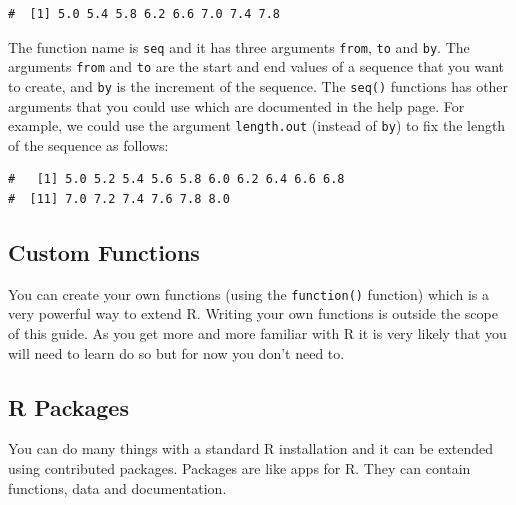 \documentclass[a4paper,9pt,twocolumn,twoside,printwatermark=false]{pinp}
\begin{document}
\begin{ShadedResult}
\begin{verbatim}
#  [1] 5.0 5.4 5.8 6.2 6.6 7.0 7.4 7.8
\end{verbatim}
\end{ShadedResult}

The function name is \texttt{seq} and it has three arguments
\texttt{from}, \texttt{to} and \texttt{by}. The arguments \texttt{from}
and \texttt{to} are the start and end values of a sequence that you want
to create, and \texttt{by} is the increment of the sequence. The
\texttt{seq()} functions has other arguments that you could use which
are documented in the help page. For example, we could use the argument
\texttt{length.out} (instead of \texttt{by}) to fix the length of the
sequence as follows:

\begin{Shaded}
\begin{Highlighting}[]
\NormalTok{(} \NormalTok{, } \NormalTok{, } \NormalTok{)}
\end{Highlighting}
\end{Shaded}

\begin{ShadedResult}
\begin{verbatim}
#   [1] 5.0 5.2 5.4 5.6 5.8 6.0 6.2 6.4 6.6 6.8
#  [11] 7.0 7.2 7.4 7.6 7.8 8.0
\end{verbatim}
\end{ShadedResult}

\subsection{Custom Functions}\label{custom-functions}

You can create your own functions (using the \texttt{function()}
function) which is a very powerful way to extend R. Writing your own
functions is outside the scope of this guide. As you get more and more
familiar with R it is very likely that you will need to learn do so but
for now you don't need to.

\subsection{R Packages}\label{r-packages}

You can do many things with a standard R installation and it can be
extended using contributed packages. Packages are like apps for R. They
can contain functions, data and documentation.
\end{document}
